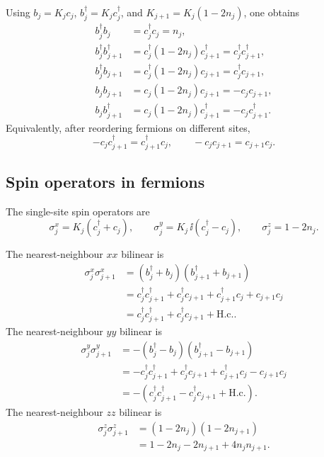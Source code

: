 Using \(b_j=K_jc_j\), \(b_j^\dagger=K_jc_j^\dagger\), and
\(K_{j+1}=K_j(1-2n_j)\), one obtains
\begin{align}
    b_j^\dagger b_j
    &=
    c_j^\dagger c_j
    =
    n_j,
    \\
    b_j^\dagger b_{j+1}^\dagger
    &=
    c_j^\dagger(1-2n_j)c_{j+1}^\dagger
    =
    c_j^\dagger c_{j+1}^\dagger,
    \\
    b_j^\dagger b_{j+1}
    &=
    c_j^\dagger(1-2n_j)c_{j+1}
    =
    c_j^\dagger c_{j+1},
    \\
    b_j b_{j+1}
    &=
    c_j(1-2n_j)c_{j+1}
    =
    -c_jc_{j+1},
    \\
    b_j b_{j+1}^\dagger
    &=
    c_j(1-2n_j)c_{j+1}^\dagger
    =
    -c_jc_{j+1}^\dagger.
\end{align}
Equivalently, after reordering fermions on different sites,
\begin{equation}
    -c_jc_{j+1}^\dagger
    =
    c_{j+1}^\dagger c_j,
    \qquad
    -c_jc_{j+1}
    =
    c_{j+1}c_j.
\end{equation}

\subsection*{Spin operators in fermions}

The single-site spin operators are
\begin{equation}
    \sigma_j^x
    =
    K_j(c_j^\dagger+c_j),
    \qquad
    \sigma_j^y
    =
    K_j\,\ii(c_j^\dagger-c_j),
    \qquad
    \sigma_j^z
    =
    1-2n_j.
\end{equation}

The nearest-neighbour \(xx\) bilinear is
\begin{align}
    \sigma_j^x\sigma_{j+1}^x
    &=
    (b_j^\dagger+b_j)(b_{j+1}^\dagger+b_{j+1})
    \nonumber\\
    &=
    c_j^\dagger c_{j+1}^\dagger
    +
    c_j^\dagger c_{j+1}
    +
    c_{j+1}^\dagger c_j
    +
    c_{j+1}c_j
    \nonumber\\
    &=
    c_j^\dagger c_{j+1}^\dagger
    +
    c_j^\dagger c_{j+1}
    +
    \text{H.c.}.
\end{align}
The nearest-neighbour \(yy\) bilinear is
\begin{align}
    \sigma_j^y\sigma_{j+1}^y
    &=
    - (b_j^\dagger-b_j)(b_{j+1}^\dagger-b_{j+1})
    \nonumber\\
    &=
    -c_j^\dagger c_{j+1}^\dagger
    +
    c_j^\dagger c_{j+1}
    +
    c_{j+1}^\dagger c_j
    -
    c_{j+1}c_j
    \nonumber\\
    &=
    -\left(
        c_j^\dagger c_{j+1}^\dagger
        -
        c_j^\dagger c_{j+1}
        +
        \text{H.c.}
    \right).
\end{align}
The nearest-neighbour \(zz\) bilinear is
\begin{align}
    \sigma_j^z\sigma_{j+1}^z
    &=
    (1-2n_j)(1-2n_{j+1})
    \nonumber\\
    &=
    1-2n_j-2n_{j+1}+4n_jn_{j+1}.
\end{align}

